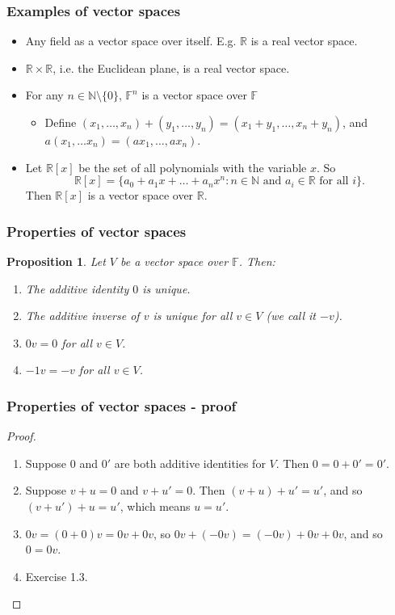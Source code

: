 \documentclass[handout]{beamer}
\newtheorem{proposition}[theorem]{Proposition}
\newcommand{\bN}{\mathbb{N}}
\newcommand{\bR}{\mathbb{R}}
\newcommand{\bF}{\mathbb{F}}
\begin{document}
\begin{frame}
\frametitle{Examples of vector spaces}
\begin{itemize}
\item Any field as a vector space over itself. E.g. $\bR$ is a real vector space.
\vspace{0.5cm}
\item $\bR\times \bR$, i.e. the Euclidean plane, is a real vector space.
\vspace{0.5cm}
\item For any $n\in\bN\setminus\{0\}$,\/ $\bF^n$ is a vector space over $\bF$ 
\begin{itemize}
\item Define $(x_1,\ldots,x_n)+(y_1,\ldots,y_n) = (x_1+y_1,\ldots,x_n+ y_n)$, and $a(x_1,\ldots x_n)=(ax_1,\ldots,ax_n)$.
\end{itemize}
\vspace{0.5cm}
\item Let $\bR[x]$ be the set of all polynomials with the variable $x$. So 
\[\bR[x] = \{ a_0 + a_1x + \ldots +a_nx^n: n\in\bN\text{ and } a_i\in\bR\text{ for all }i\}.\]
Then $\bR[x]$ is a vector space over $\bR$.
\end{itemize}
\end{frame}

\begin{frame}
\frametitle{Properties of vector spaces}
\begin{proposition}
Let $V$ be a vector space over $\bF$. Then:
\begin{enumerate}
\item The additive identity $0$ is unique.
\item The additive inverse of $v$ is unique for all $v\in V$ (we call it $-v$).
\item $0v = 0$ for all $v\in V$.
\item $-1v = -v$ for all $v\in V$.
\end{enumerate}
\end{proposition}
\end{frame}

\begin{frame}
\frametitle{Properties of vector spaces - proof}
\begin{proof}\mbox{}
\begin{enumerate}
\vspace{0.5cm}
\item Suppose $0$ and $0'$ are both additive identities for $V$. Then $0 = 0 + 0' = 0'$.
\vspace{0.5cm}
\item Suppose $v+u = 0$ and $v + u' =0$. Then $(v + u) + u' = u'$, and so $(v + u') + u = u'$, which means $u = u'$.
\vspace{0.5cm}
\item $0v = (0+0)v = 0v + 0v$, so $0v +(-0v) = (-0v) + 0v + 0v$, and so $0 = 0v$.
\vspace{0.5cm}
\item Exercise 1.3.
\end{enumerate}
\end{proof}
\end{frame}
\end{document}
